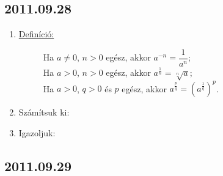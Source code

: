     
\subsection*{2011.09.28}

\begin{enumerate}
		\item \begin{description}
        \item[\underline{Definíció:}] Ha $a\ne0$, $n>0$ egész, akkor $a^{-n}=\dfrac{1}{a^{n}}$;\\
Ha $a>0$, $n>0$ egész, akkor $a^{\frac{1}{n}}=\sqrt[n]{a}$;\\
Ha $a>0$, $q>0$ és $p$ egész, akkor $a^{\frac{p}{q}}=\left(a^{\frac{1}{q}}\right)^{p}$.
\end{description}
		\item Számítsuk ki:
		\item Igazoljuk:
\end{enumerate}

\subsection*{2011.09.29}

